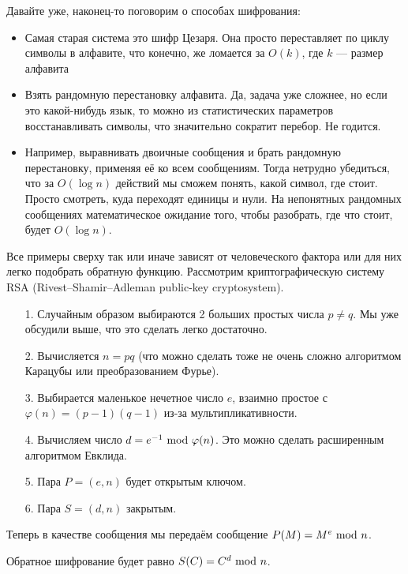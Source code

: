\documentclass[a4paper, 12pt]{article}
\begin{document}
Давайте уже, наконец-то поговорим о способах шифрования:

\begin{itemize}
  \item Самая старая система это шифр Цезаря. Она просто переставляет по циклу
  символы в алфавите, что конечно, же ломается за $O(k)$, где $k$ --- размер
  алфавита
  \item Взять рандомную перестановку алфавита. Да, задача уже сложнее, но
  если это какой-нибудь язык, то можно из статистических параметров
  восстанавливать символы, что значительно сократит перебор. Не годится.
  \item Например, выравнивать двоичные сообщения и брать рандомную перестановку,
  применяя её ко всем сообщениям. Тогда нетрудно убедиться, что за $O(\log n)$
  действий мы сможем понять, какой символ, где стоит. Просто смотреть, куда
  переходят единицы и нули. На непонятных рандомных сообщениях математическое
  ожидание того, чтобы разобрать, где что стоит, будет $O(\log n)$.
\end{itemize}

Все примеры сверху так или иначе зависят от человеческого фактора или
для них легко подобрать обратную функцию. Рассмотрим криптографическую систему
RSA (Rivest--Shamir--Adleman public-key cryptosystem).

\begin{itemize}
  \item[1.] Случайным образом выбираются 2 больших простых числа $p \neq q$. Мы
  уже обсудили выше, что это сделать легко достаточно.
  \item[2.] Вычисляется $n = pq$ (что можно сделать тоже не очень сложно
  алгоритмом Карацубы или преобразованием Фурье).
  \item[3.] Выбирается маленькое нечетное число $e$, взаимно простое с 
  $\varphi(n) = (p - 1)(q - 1)$ из-за мультипликативности.
  \item[4.] Вычисляем число $d = e^{-1} \ \text{mod} \  \varphi(n)$. Это можно сделать
  расширенным алгоритмом Евклида.
  \item[5.] Пара $P = (e, n)$ будет открытым ключом.
  \item[6.] Пара $S = (d, n)$ закрытым.
\end{itemize}

Теперь в качестве сообщения мы передаём сообщение $P(M) = M^{e} \ \text{mod} \  n$.

Обратное шифрование будет равно $S(C) = C^{d} \ \text{mod} \  n$.
\end{document}
